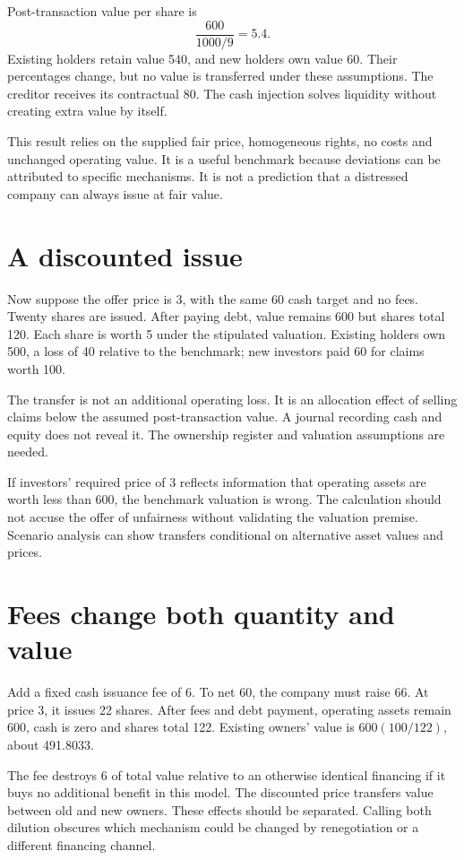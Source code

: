 Post-transaction value per share is
\begin{equation}
 \frac{600}{1000/9}=5.4.
\end{equation}
Existing holders retain value 540, and new holders own value 60. Their percentages change, but no value is transferred under these assumptions. The creditor receives its contractual 80. The cash injection solves liquidity without creating extra value by itself.

This result relies on the supplied fair price, homogeneous rights, no costs and unchanged operating value. It is a useful benchmark because deviations can be attributed to specific mechanisms. It is not a prediction that a distressed company can always issue at fair value.

\section{A discounted issue}
Now suppose the offer price is 3, with the same 60 cash target and no fees. Twenty shares are issued. After paying debt, value remains 600 but shares total 120. Each share is worth 5 under the stipulated valuation. Existing holders own 500, a loss of 40 relative to the benchmark; new investors paid 60 for claims worth 100.

The transfer is not an additional operating loss. It is an allocation effect of selling claims below the assumed post-transaction value. A journal recording cash and equity does not reveal it. The ownership register and valuation assumptions are needed.

If investors' required price of 3 reflects information that operating assets are worth less than 600, the benchmark valuation is wrong. The calculation should not accuse the offer of unfairness without validating the valuation premise. Scenario analysis can show transfers conditional on alternative asset values and prices.

\section{Fees change both quantity and value}
Add a fixed cash issuance fee of 6. To net 60, the company must raise 66. At price 3, it issues 22 shares. After fees and debt payment, operating assets remain 600, cash is zero and shares total 122. Existing owners' value is $600(100/122)$, about 491.8033.

The fee destroys 6 of total value relative to an otherwise identical financing if it buys no additional benefit in this model. The discounted price transfers value between old and new owners. These effects should be separated. Calling both dilution obscures which mechanism could be changed by renegotiation or a different financing channel.

